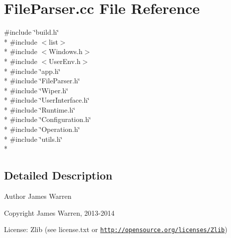 \section{File\-Parser.\-cc File Reference}
\label{_file_parser_8cc}
{\ttfamily \#include \char`\"{}build.\-h\char`\"{}}\\*
{\ttfamily \#include $<$list$>$}\\*
{\ttfamily \#include $<$Windows.\-h$>$}\\*
{\ttfamily \#include $<$User\-Env.\-h$>$}\\*
{\ttfamily \#include \char`\"{}app.\-h\char`\"{}}\\*
{\ttfamily \#include \char`\"{}File\-Parser.\-h\char`\"{}}\\*
{\ttfamily \#include \char`\"{}Wiper.\-h\char`\"{}}\\*
{\ttfamily \#include \char`\"{}User\-Interface.\-h\char`\"{}}\\*
{\ttfamily \#include \char`\"{}Runtime.\-h\char`\"{}}\\*
{\ttfamily \#include \char`\"{}Configuration.\-h\char`\"{}}\\*
{\ttfamily \#include \char`\"{}Operation.\-h\char`\"{}}\\*
{\ttfamily \#include \char`\"{}utils.\-h\char`\"{}}\\*


\subsection{Detailed Description}
\begin{DoxyAuthor}{Author}
James Warren 
\end{DoxyAuthor}
\begin{DoxyCopyright}{Copyright}
James Warren, 2013-\/2014 
\end{DoxyCopyright}
\begin{DoxyParagraph}{License\-:}
Zlib (see license.\-txt or \href{http://opensource.org/licenses/Zlib}{\tt http\-://opensource.\-org/licenses/\-Zlib}) 
\end{DoxyParagraph}
